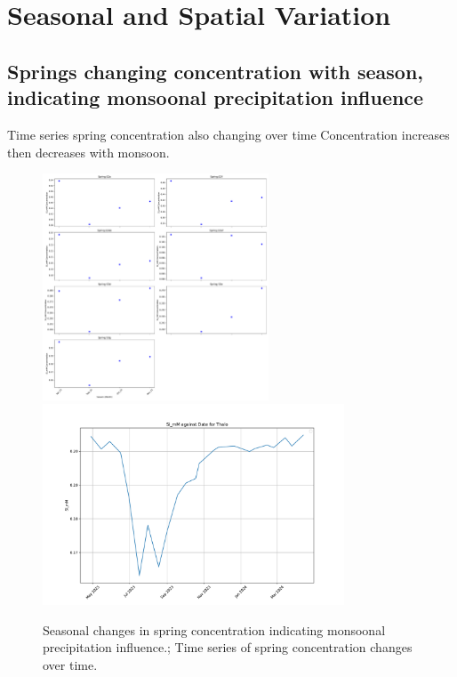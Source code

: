 
\section{Seasonal and Spatial Variation}

\subsection{Springs changing concentration with season, indicating monsoonal precipitation influence}
Time series spring concentration also changing over time Concentration increases then decreases with monsoon.

\begin{figure}[h]
    \centering
    \includegraphics[width=0.6\textwidth]{Si_mM_concentrations_springs.pdf}
    \includegraphics[width=0.8\textwidth]{Si_mM_Thalo_timeseries.pdf}
    \caption{Seasonal changes in spring concentration indicating monsoonal precipitation influence.; Time series of spring concentration changes over time.}
    \label{fig:time_series_changes}
\end{figure}

